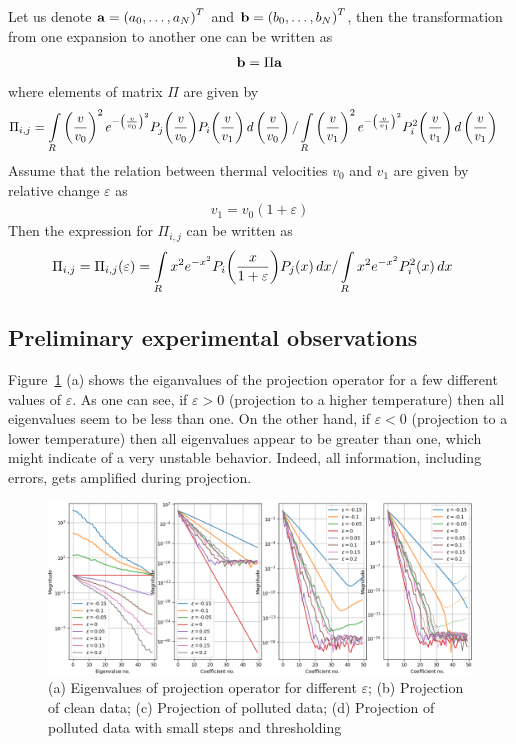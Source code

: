 \documentclass{article}
\begin{document}
Let us denote $\mathbf{a} = \left( a_0,\ldots, a_N \right)^T$ and $\mathbf{b} = \left( b_0,\ldots, b_N \right)^T$, then the transformation from one expansion to another one can be written as 
\begin{align*}
\mathbf{b} = \Pi \mathbf{a}
\end{align*}
where elements of matrix $\Pi$ are given by
\begin{align*}
\Pi_{i,j} &= \myint_{R} \left( \frac{v}{v_0} \right)^2 e^{-\left( \frac{v}{v_0} \right)^2} P_j\of{\frac{v}{v_0}} P_i\of{\frac{v}{v_1}} \diff{\left(\frac{v}{v_0}\right)} 
/ 
\myint_{R} \left( \frac{v}{v_1} \right)^2 e^{-\left( \frac{v}{v_1} \right)^2} P^2_i\of{\frac{v}{v_1}} \diff{\left(\frac{v}{v_1}\right)}
\end{align*}
Assume that the relation between thermal velocities $v_0$ and $v_1$ are given by relative change $\varepsilon$ as
\begin{align*}
v_1 = v_0 \left( 1 + \varepsilon \right)
\end{align*}
Then the expression for $\Pi_{i,j}$ can be written as
\begin{align*}
\Pi_{i,j} = \Pi_{i,j} \of{\varepsilon}
&= \myint_{R} x^2 e^{-x^2} P_i\of{\frac{x}{ 1 + \varepsilon }} P_j\of{x} \diff{x} / \myint_{R} x^2 e^{-x^2} P^2_i\of{x} \diff{x}
\end{align*}

\subsection{Preliminary experimental observations}

Figure~\ref{fig:projection} (a) shows the eiganvalues of the projection operator for a few different values of $\varepsilon$. As one can see, if $\varepsilon > 0$ (projection to a higher temperature) then all eigenvalues seem to be less than one. On the other hand, if $\varepsilon < 0$ (projection to a lower temperature) then all eigenvalues appear to be greater than one, which might indicate of a very unstable behavior. Indeed, all information, including errors, gets amplified during projection. 

\begin{figure}[H]
\label{fig:projection}
\centering
\includegraphics[width=\textwidth]{dat/projection_different_eps.png}
\caption{(a) Eigenvalues of projection operator for different $\varepsilon$; (b) Projection of clean data; (c) Projection of polluted data; (d) Projection of polluted data with small steps and thresholding}
\end{figure}
\end{document}

